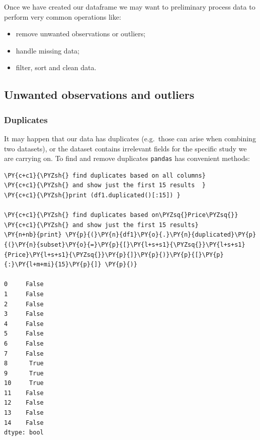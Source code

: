 Once we have created our dataframe we may want to preliminary process data to perform very common operations like:

\begin{itemize}
\item remove unwanted observations or outliers;
\item handle missing data;
\item filter, sort and clean data.
\end{itemize}

\subsection{Unwanted observations and outliers}

\subsubsection{Duplicates}

It may happen that our data has duplicates (e.g.~those can arise when combining two datasets), or the dataset contains irrelevant fields for the specific study we are carrying on. To find and remove duplicates \texttt{pandas} has convenient methods:

\begin{tcolorbox}[breakable, size=fbox, boxrule=1pt, pad at break*=1mm,colback=cellbackground, colframe=cellborder]
\begin{Verbatim}[commandchars=\\\{\}]
\PY{c+c1}{\PYZsh{} find duplicates based on all columns}
\PY{c+c1}{\PYZsh{} and show just the first 15 results  }
\PY{c+c1}{\PYZsh{}print (df1.duplicated()[:15]) }

\PY{c+c1}{\PYZsh{} find duplicates based on\PYZsq{}Price\PYZsq{}}
\PY{c+c1}{\PYZsh{} and show just the first 15 results}
\PY{n+nb}{print} \PY{p}{(}\PY{n}{df1}\PY{o}{.}\PY{n}{duplicated}\PY{p}{(}\PY{n}{subset}\PY{o}{=}\PY{p}{[}\PY{l+s+s1}{\PYZsq{}}\PY{l+s+s1}{Price}\PY{l+s+s1}{\PYZsq{}}\PY{p}{]}\PY{p}{)}\PY{p}{[}\PY{p}{:}\PY{l+m+mi}{15}\PY{p}{]} \PY{p}{)}

0     False
1     False
2     False
3     False
4     False
5     False
6     False
7     False
8      True
9      True
10     True
11    False
12    False
13    False
14    False
dtype: bool
\end{Verbatim}
\end{tcolorbox}

